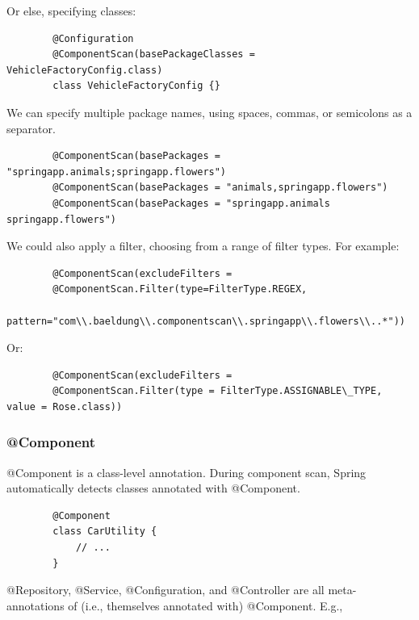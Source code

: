 \documentclass{scrartcl}
\begin{document}
    Or else, specifying classes:

    \begin{lstlisting}
        @Configuration
        @ComponentScan(basePackageClasses = VehicleFactoryConfig.class)
        class VehicleFactoryConfig {}
    \end{lstlisting}

    We can specify multiple package names, using spaces, commas, or semicolons as a separator.

    \begin{lstlisting}
        @ComponentScan(basePackages = "springapp.animals;springapp.flowers")
        @ComponentScan(basePackages = "animals,springapp.flowers")
        @ComponentScan(basePackages = "springapp.animals springapp.flowers")
    \end{lstlisting}

    We could also apply a filter, choosing from a range of filter types. For example:

    \begin{lstlisting}
        @ComponentScan(excludeFilters =
        @ComponentScan.Filter(type=FilterType.REGEX,
        pattern="com\\.baeldung\\.componentscan\\.springapp\\.flowers\\..*"))
    \end{lstlisting}

    Or:
    \begin{lstlisting}
        @ComponentScan(excludeFilters =
        @ComponentScan.Filter(type = FilterType.ASSIGNABLE\_TYPE, value = Rose.class))
    \end{lstlisting}

\subsubsection{@Component}

    @Component is a class-level annotation. During component scan, Spring automatically detects classes annotated with @Component.

    \begin{lstlisting}
        @Component
        class CarUtility {
            // ...
        }
    \end{lstlisting}

    @Repository, @Service, @Configuration, and @Controller are all meta-annotations of (i.e., themselves annotated with) @Component. E.g.,
\end{document}
